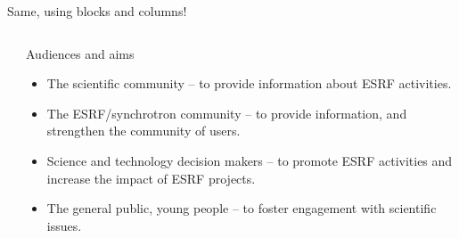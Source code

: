 \documentclass[usenames,dvipsnames]{beamer}
\begin{document}
\begin{frame}[t]{Same, using blocks and columns!}
\begin{columns}[onlytextwidth]
\begin{column}{0.3\textwidth}
\end{column}%
\hfill%
\begin{column}{0.5\textwidth}
\begin{block}{\LARGE Audiences and aims}
\setlength{\leftmargini}{0.9em} %
\begin{itemize}
  \item The scientific community -- to provide information about ESRF activities.
  \item The ESRF/synchrotron community -- to provide information, and strengthen the community of users.
  \item Science and technology decision makers -- to promote ESRF activities and increase the impact of ESRF projects.
  \item The general public, young people -- to foster engagement with scientific issues.
\end{itemize}
\end{block}
\end{column}%
\end{columns}

\end{frame}

\end{document}
